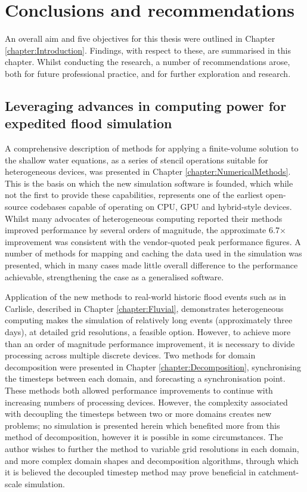 \chapter{Conclusions and recommendations}
\label{chapter:Conclusions}

An overall aim and five objectives for this thesis were outlined in Chapter \ref{chapter:Introduction}. Findings, with respect to these, are summarised in this chapter. Whilst conducting the research, a number of recommendations arose, both for future professional practice, and for further exploration and research.

\section{Leveraging advances in computing power for expedited flood simulation}

A comprehensive description of methods for applying a finite-volume solution to the shallow water equations, as a series of stencil operations suitable for heterogeneous devices, was presented in Chapter \ref{chapter:NumericalMethods}. This is the basis on which the new simulation software is founded, which while not the first to provide these capabilities, represents one of the earliest open-source codebases capable of operating on CPU, GPU and hybrid-style devices. Whilst many advocates of heterogeneous computing reported their methods improved performance by several orders of magnitude, the approximate 6.7$\times$ improvement was consistent with the vendor-quoted peak performance figures. A number of methods for mapping and caching the data used in the simulation was presented, which in many cases made little overall difference to the performance achievable, strengthening the case as a generalised software.

Application of the new methods to real-world historic flood events such as in Carlisle, described in Chapter \ref{chapter:Fluvial}, demonstrates heterogeneous computing makes the simulation of relatively long events (approximately three days), at detailed grid resolutions, a feasible option. However, to achieve more than an order of magnitude performance improvement, it is necessary to divide processing across multiple discrete devices. Two methods for domain decomposition were presented in Chapter \ref{chapter:Decomposition}, synchronising the timesteps between each domain, and forecasting a synchronisation point. These methods both allowed performance improvements to continue with increasing numbers of processing devices. However, the complexity associated with decoupling the timesteps between two or more domains creates new problems; no simulation is presented herein which benefited more from this method of decomposition, however it is possible in some circumstances. The author wishes to further the method to variable grid resolutions in each domain, and more complex domain shapes and decomposition algorithms, through which it is believed the decoupled timestep method may prove beneficial in catchment-scale simulation.

